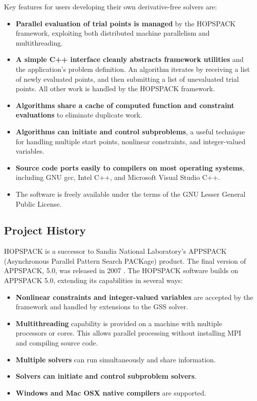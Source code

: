 \medskip
\noindent
Key features for users developing their own derivative-free solvers are:
\begin{itemize}
  \item  {\bf Parallel evaluation of trial points is managed}
         by the HOPSPACK framework, exploiting both distributed machine
         parallelism and multithreading.
  \item  {\bf A simple C++ interface cleanly abstracts framework utilities}
         and the application's problem definition.  An algorithm iterates by
         receiving a list of newly evaluated points, and then submitting a
         list of unevaluated trial points.  All other work is handled by
         the HOPSPACK framework.
  \item  {\bf Algorithms share a cache of computed function and constraint
         evaluations} to eliminate duplicate work.
  \item  {\bf Algorithms can initiate and control subproblems},
         a useful technique for handling multiple start points,
         nonlinear constraints, and integer-valued variables.
  \item  {\bf Source code ports easily to compilers on most operating systems},
         including GNU gcc, Intel C++, and Microsoft Visual Studio C++.
  \item  The software is freely available under the terms of the GNU Lesser
         General Public License.
\end{itemize}


\subsection{Project History}

HOPSPACK is a successor to Sandia National Laboratory's APPSPACK
(Asynchronous Parallel Pattern Search PACKage) product.  The final version
of APPSPACK, 5.0, was released in 2007 \cite{APPS-GrKo05,APPS-Ko05}.
The HOPSPACK software builds on APPSPACK 5.0, extending its capabilities
in several ways:
\begin{itemize}
  \item {\bf Nonlinear constraints and integer-valued variables} are accepted
        by the framework and handled by extensions to the GSS solver.
  \item {\bf Multithreading} capability is provided on a machine with
        multiple processors or cores.  This allows parallel processing
        without installing MPI and compiling source code.
  \item {\bf Multiple solvers} can run simultaneously and share information.
  \item {\bf Solvers can initiate and control subproblem solvers}.
  \item {\bf Windows and Mac OSX native compilers} are supported.
\end{itemize}

